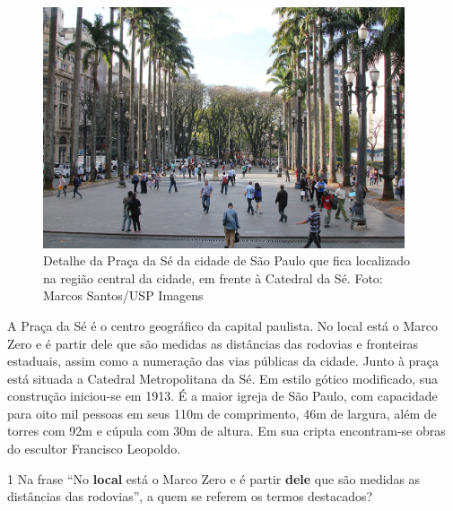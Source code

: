 \begin{myquote}

\begin{figure}[H]
\centering
\includegraphics[width=0.95\textwidth]{./imgSAEB_7_POR/media/image54.png}
\caption{Detalhe da Praça da Sé da cidade de São Paulo que fica localizado na região central da cidade, em frente à Catedral da Sé. Foto: Marcos Santos/USP Imagens}
\end{figure}

A Praça da Sé é o centro geográfico da capital paulista. No local está o Marco Zero 
e é partir dele que são medidas as distâncias das rodovias e fronteiras estaduais, 
assim como a numeração das vias públicas da cidade. Junto à praça está situada a 
Catedral Metropolitana da Sé. Em estilo gótico modificado, sua construção iniciou-se em 1913.
É a maior igreja de São Paulo, com capacidade para oito mil pessoas em seus 110m de comprimento, 
46m de largura, além de torres com 92m e cúpula com 30m de altura. Em sua cripta encontram-se
obras do escultor Francisco Leopoldo.


\end{myquote}

\num{1} Na frase ``No \textbf{local} está o Marco Zero e é partir \textbf{dele} que são medidas
as distâncias das rodovias'', a quem se referem os termos destacados?

